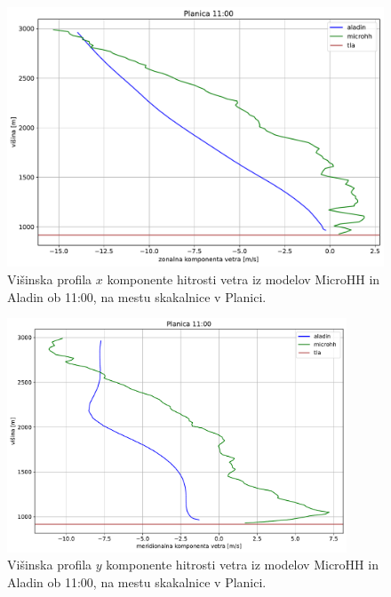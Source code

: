\documentclass[mat2, tisk]{fmfdelo}
\begin{document}
\begin{figure}[h!]
  \centering
  \includegraphics[width=\textwidth]{rezultati/u_planica_long_5.pdf}
  \caption{Višinska profila $x$ komponente hitrosti vetra iz modelov MicroHH in Aladin ob 11:00, na mestu skakalnice v Planici.}
  \label{fig:planica_T3}
\end{figure}


\begin{figure}[h!]
  \centering
  \includegraphics[width=0.9\textwidth]{rezultati/v_planica_long_5.pdf}
  \caption{Višinska profila $y$ komponente hitrosti vetra iz modelov MicroHH in Aladin ob 11:00, na mestu skakalnice v Planici.}
  \label{fig:planica_T4}
\end{figure}
\end{document}
